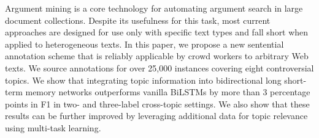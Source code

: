 Argument mining is a core technology for automating argument search in large document collections. Despite its usefulness for this task, most current approaches are designed for use only with specific text types and fall short when applied to heterogeneous texts.  In this paper, we propose a new sentential annotation scheme that is reliably applicable by crowd workers to arbitrary Web texts. We source annotations for over 25,000 instances covering eight controversial topics. We show that integrating topic information into bidirectional long short-term memory networks outperforms vanilla BiLSTMs by more than 3 percentage points in F1 in two- and three-label cross-topic settings. We also show that these results can be further improved by leveraging additional data for topic relevance using multi-task learning.
